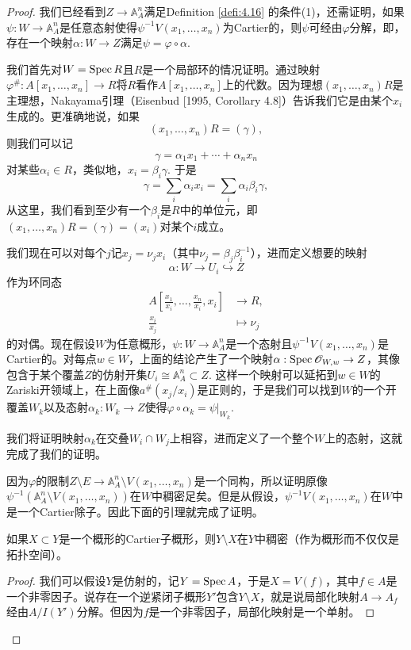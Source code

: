 \begin{proof}
	我们已经看到$Z\to \mathbb A_A^n$满足Definition \ref{defi:4.16} 的条件(1)，还需证明，如果$\psi:W\to \mathbb A_A^n$是任意态射使得$\psi^{-1}V(x_1,\dots,x_n)$为Cartier的，则$\psi$可经由$\varphi$分解，即，存在一个映射$\alpha:W\to Z$满足$\psi=\varphi\circ\alpha$.

	我们首先对$W=\operatorname{Spec} R$且$R$是一个局部环的情况证明。通过映射$\varphi^\#:A[x_1,\dots,x_n]\to R$将$R$看作$A[x_1,\dots,x_n]$上的代数。因为理想$(x_1,\dots,x_n)R$是主理想，Nakayama引理（Eisenbud [1995, Corollary 4.8]）告诉我们它是由某个$x_i$生成的。更准确地说，如果
	\[
		(x_1,\dots,x_n)R=(\gamma),
	\]
	则我们可以记
	\[
		\gamma=\alpha_1 x_1+\cdots +\alpha_n x_n
	\]
	对某些$\alpha_i\in R$，类似地，$x_i=\beta_i\gamma$. 于是
	\[
		\gamma=\sum_i \alpha_i x_i=\sum_i \alpha_i \beta_i \gamma,
	\]
	从这里，我们看到至少有一个$\beta_i$是$R$中的单位元，即$(x_1,\dots,x_n)R=(\gamma)=(x_i)$对某个$i$成立。

	我们现在可以对每个$j$记$x_j=\nu_j x_i$（其中$\nu_j=\beta_j\beta_i^{-1}$），进而定义想要的映射
	\[
		\alpha:W\to U_i\hookrightarrow Z
	\]
	作为环同态
	\[
	\begin{aligned}
		A\left[\frac{x_1}{x_i},\dots,\frac{x_n}{x_i},x_i\right] & \longrightarrow R,\\
		\frac{x_i}{x_j}&\longmapsto \nu_j
	\end{aligned}
	\]
	的对偶。现在假设$W$为任意概形，$\psi:W\to \mathbb A_A^n$是一个态射且$\psi^{-1}V(x_1,\dots,x_n)$是Cartier的。对每点$w\in W$，上面的结论产生了一个映射$\alpha:\operatorname{Spec} \mathscr O_{W,w}\to Z$，其像包含于某个覆盖$Z$的仿射开集$U_i\cong \mathbb A_A^n\subset Z$. 这样一个映射可以延拓到$w\in W$的Zariski开领域上，在上面像$a^\#(x_j/x_i)$是正则的，于是我们可以找到$W$的一个开覆盖$W_k$以及态射$\alpha_k:W_k\to Z$使得$\varphi\circ \alpha_k=\psi|_{W_k}$.

	我们将证明映射$\alpha_k$在交叠$W_i\cap W_j$上相容，进而定义了一个整个$W$上的态射，这就完成了我们的证明。

	因为$\varphi$的限制$Z\setminus E\to \mathbb A_A^n\setminus V(x_1,\dots,x_n)$是一个同构，所以证明原像$\psi^{-1}(\mathbb A_A^n\setminus V(x_1,\dots,x_n))$在$W$中稠密足矣。但是从假设，$\psi^{-1}V(x_1,\dots,x_n)$在$W$中是一个Cartier除子。因此下面的引理就完成了证明。

	\begin{lem}\label{lem:4.19}
		如果$X\subset Y$是一个概形的Cartier子概形，则$Y\setminus X$在$Y$中稠密（作为概形而不仅仅是拓扑空间）。
	\end{lem}

	\begin{proof}
		我们可以假设$Y$是仿射的，记$Y=\operatorname{Spec} A$，于是$X=V(f)$，其中$f\in A$是一个非零因子。说存在一个逆紧闭子概形$Y'$包含$Y\setminus X$，就是说局部化映射$A\to A_f$经由$A/I(Y')$分解。但因为$f$是一个非零因子，局部化映射是一个单射。
	\end{proof}
	\let\qed\relax
\end{proof}

